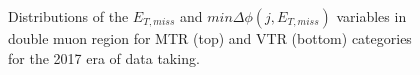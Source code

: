 \begin{figure}[htbp]
{    }
  \caption{Distributions of the $E_{T,miss}$ and $min\Delta\phi(j,E_{T,miss})$  variables in double muon region for MTR (top) and VTR (bottom) categories for the 2017 era of data taking.}
  \label{fig:2017_Zmumu_2}
\end{figure}



